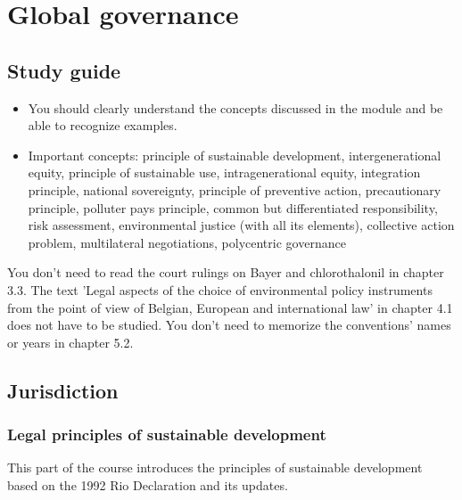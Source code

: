 \documentclass[../summary.tex]{subfiles}
\begin{document}
	
	\section{Global governance}
	
	\subsection{Study guide}
		\label{sec:13-study-guide}
	
	\begin{itemize}
		\item You should clearly understand the concepts discussed in the module and be able to recognize examples.
		\item Important concepts: principle of sustainable development, intergenerational equity, principle of sustainable use, intragenerational equity, integration principle, national
		sovereignty, principle of preventive action, precautionary principle, polluter pays principle, common but differentiated responsibility, risk assessment, environmental justice (with all its elements), collective action problem, multilateral negotiations, polycentric governance
	\end{itemize}
	
	You don’t need to read the court rulings on Bayer and chlorothalonil in chapter 3.3. The text 'Legal aspects of the choice of environmental policy instruments from the point of view of Belgian, European and international law' in chapter 4.1 does not have to be studied. You don’t need to memorize the conventions’ names or years in chapter 5.2.
	
	\subsection{Jurisdiction}
		\subsubsection{Legal principles of sustainable development}
			This part of the course introduces the principles of sustainable development based on the 1992 Rio Declaration and its updates.
			
\end{document}
